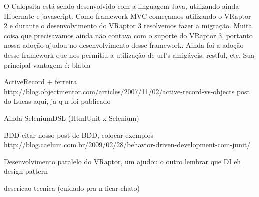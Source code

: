 O Calopsita está sendo desenvolvido com a linguagem Java, utilizando ainda Hibernate e javascript. Como framework MVC começamos utilizando o VRaptor 2 e durante o desenvolvimento do VRaptor 3 resolvemos fazer a migração. Muita coisa que precisavamos ainda não contava com o suporte do VRaptor 3, portanto nossa adoção ajudou no desenvolvimento desse framework. Ainda foi a adoção desse framework que nos permitiu a utilização de url's amigáveis, restful, etc. Sua principal vantagem é: blabla




ActiveRecord + ferreira
http://blog.objectmentor.com/articles/2007/11/02/active-record-vs-objects
post do Lucas aqui, ja q n foi publicado

Ainda SeleniumDSL (HtmlUnit x Selenium)

BDD
citar nosso post de BDD, colocar exemplos
http://blog.caelum.com.br/2009/02/28/behavior-driven-development-com-junit/

Desenvolvimento paralelo do VRaptor, um ajudou o outro
lembrar que DI eh design pattern

descricao tecnica (cuidado pra n ficar chato)



